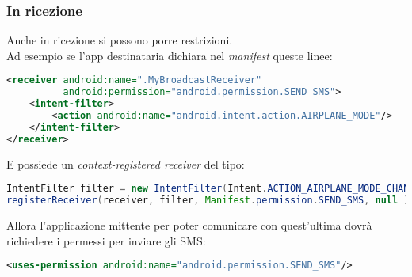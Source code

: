 \subsubsection{In ricezione}
Anche in ricezione si possono porre restrizioni.\\
Ad esempio se l'app destinataria dichiara nel \textit{manifest} queste linee:
\begin{lstlisting}[language=XML]
<receiver android:name=".MyBroadcastReceiver"
          android:permission="android.permission.SEND_SMS">
    <intent-filter>
        <action android:name="android.intent.action.AIRPLANE_MODE"/>
    </intent-filter>
</receiver>
\end{lstlisting}
E possiede un \textit{context-registered receiver} del tipo:
\begin{lstlisting}[language=Java]
IntentFilter filter = new IntentFilter(Intent.ACTION_AIRPLANE_MODE_CHANGED);
registerReceiver(receiver, filter, Manifest.permission.SEND_SMS, null );
\end{lstlisting}
Allora l'applicazione mittente per poter comunicare con quest'ultima dovrà richiedere i permessi per inviare gli SMS:
\begin{lstlisting}[language=XML]
<uses-permission android:name="android.permission.SEND_SMS"/>
\end{lstlisting}
